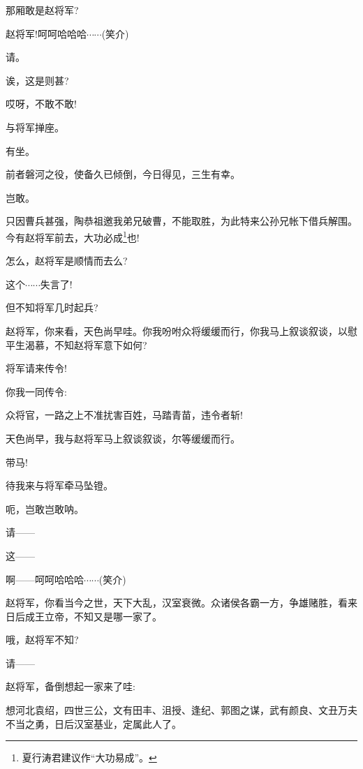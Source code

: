 {{\vspace{5pt}}



{那厢敢是赵将军?}

{赵将军!呵呵哈哈哈$\cdots{}\cdots{}$({\hwfs 笑}{\hwfs 介})}

{请。}

{诶，这是则甚?}

{哎呀，不敢不敢!}

{与将军掸座。}

{有坐。}

{前者磐河之役，使备久已倾倒，今日得见，三生有幸。}

{岂敢。}

{只因曹兵甚强，陶恭祖邀我弟兄破曹，不能取胜，为此特来公孙兄帐下借兵解围。今有赵将军前去，大功必成}\footnote{夏行涛{\scriptsize 君}建议作``大功易成''。}{也!}

{怎么，赵将军是顺情而去么?}

{这个$\cdots{}\cdots{}$失言了!}

{但不知将军几时起兵?}

{赵将军，你来看，天色尚早哇。你我吩咐众将缓缓而行，你我马上叙谈叙谈，以慰平生渴慕，不知赵将军意下如何?}

{将军请来传令!}

{你我一同传令:~}

{众将官，一路之上不准扰害百姓，马踏青苗，违令者斩!}

{天色尚早，我与赵将军马上叙谈叙谈，尔等缓缓而行。}

{带马!}

{待我来与将军牵马坠镫。}

{呃，岂敢岂敢呐。}

{请------}

{这------}

{啊------呵呵哈哈哈$\cdots{}\cdots{}$({\hwfs 笑介})}

{赵将军，你看当今之世，天下大乱，汉室衰微。众诸侯各霸一方，争雄赌胜，看来日后成王立帝，不知又是哪一家了。}

{哦，赵将军不知?}

{请------}

{赵将军，备倒想起一家来了哇:~}

{想河北袁绍，四世三公，文有田丰、沮授、逢纪、郭图之谋，武有颜良、文丑万夫不当之勇，日后汉室基业，定属此人了。}

}

